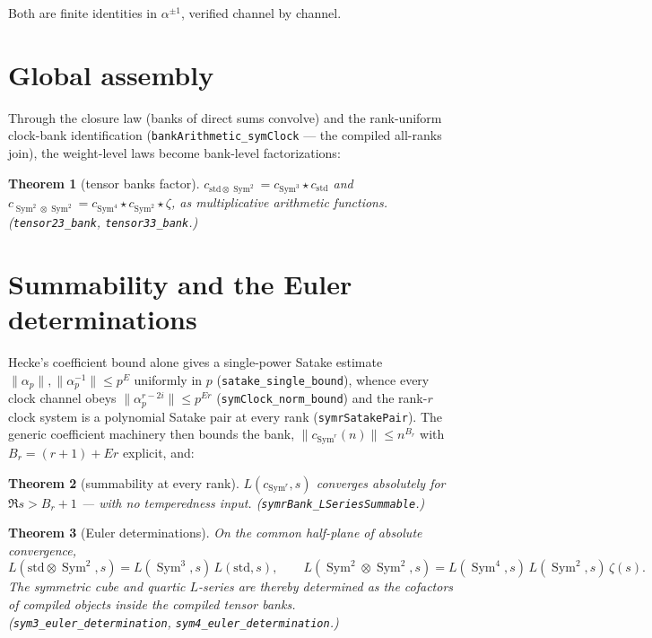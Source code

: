 \documentclass[11pt]{article}
\newtheorem{theorem}{Theorem}
\newcommand{\Sym}{\operatorname{Sym}}
\begin{document}
Both are finite identities in $\alpha^{\pm1}$, verified channel by channel.

\section{Global assembly}

Through the closure law (banks of direct sums convolve) and the rank-uniform clock-bank
identification (\texttt{bankArithmetic\_symClock} --- the compiled all-ranks join),
the weight-level laws become bank-level factorizations:

\begin{theorem}[tensor banks factor]\label{thm:banks}
$c_{\mathrm{std}\otimes\Sym^2}=c_{\Sym^3}\star c_{\mathrm{std}}$ and
$c_{\Sym^2\otimes\Sym^2}=c_{\Sym^4}\star c_{\Sym^2}\star\zeta$, as multiplicative
arithmetic functions.  (\texttt{tensor23\_bank}, \texttt{tensor33\_bank}.)
\end{theorem}

\section{Summability and the Euler determinations}

Hecke's coefficient bound alone gives a single-power Satake estimate
$\|\alpha_p\|,\|\alpha_p^{-1}\|\le p^{E}$ uniformly in $p$
(\texttt{satake\_single\_bound}), whence every clock channel obeys
$\|\alpha_p^{r-2i}\|\le p^{Er}$ (\texttt{symClock\_norm\_bound}) and the rank-$r$ clock
system is a polynomial Satake pair at every rank (\texttt{symrSatakePair}).  The generic
coefficient machinery then bounds the bank, $\|c_{\Sym^r}(n)\|\le n^{B_r}$ with
$B_r=(r{+}1)+Er$ explicit, and:

\begin{theorem}[summability at every rank]\label{thm:summ}
$L(c_{\Sym^r},s)$ converges absolutely for $\Re s>B_r+1$ --- with no temperedness
input.  (\texttt{symrBank\_LSeriesSummable}.)
\end{theorem}

\begin{theorem}[Euler determinations]\label{thm:euler}
On the common half-plane of absolute convergence,
\[
  L(\mathrm{std}\otimes\Sym^2,s)=L(\Sym^3,s)\,L(\mathrm{std},s),\qquad
  L(\Sym^2\otimes\Sym^2,s)=L(\Sym^4,s)\,L(\Sym^2,s)\,\zeta(s).
\]
The symmetric cube and quartic $L$-series are thereby determined as the cofactors of
compiled objects inside the compiled tensor banks.
(\texttt{sym3\_euler\_determination}, \texttt{sym4\_euler\_determination}.)
\end{theorem}
\end{document}
